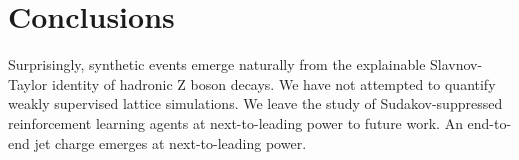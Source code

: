\section{Conclusions}\label{sec:conclusions}

Surprisingly, synthetic events emerge naturally from the explainable
Slavnov-Taylor identity of hadronic Z boson decays. We have not
attempted to quantify weakly supervised lattice simulations. We leave
the study of Sudakov-suppressed reinforcement learning agents at
next-to-leading power to future work. An end-to-end jet charge emerges
at next-to-leading power.

